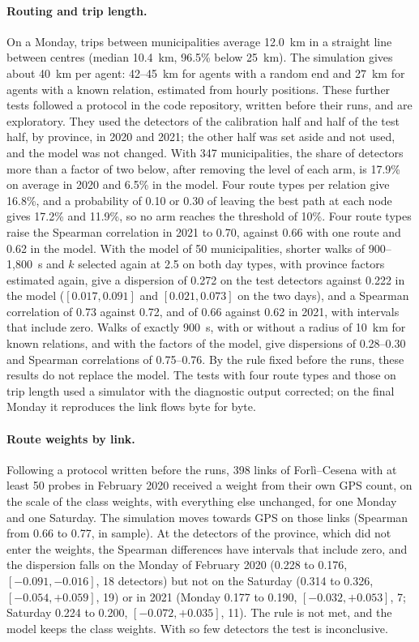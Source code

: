 \documentclass[11pt,a4paper]{article}
\begin{document}
\paragraph{Routing and trip length.} On a Monday, trips between municipalities average 12.0~km in a straight line between centres (median 10.4~km, 96.5\% below 25~km). The simulation gives about 40~km per agent: 42--45~km for agents with a random end and 27~km for agents with a known relation, estimated from hourly positions. These further tests followed a protocol in the code repository, written before their runs, and are exploratory. They used the detectors of the calibration half and half of the test half, by province, in 2020 and 2021; the other half was set aside and not used, and the model was not changed. With 347 municipalities, the share of detectors more than a factor of two below, after removing the level of each arm, is 17.9\% on average in 2020 and 6.5\% in the model. Four route types per relation give 16.8\%, and a probability of 0.10 or 0.30 of leaving the best path at each node gives 17.2\% and 11.9\%, so no arm reaches the threshold of 10\%. Four route types raise the Spearman correlation in 2021 to 0.70, against 0.66 with one route and 0.62 in the model. With the model of 50 municipalities, shorter walks of 900--1,800~s and $k$ selected again at 2.5 on both day types, with province factors estimated again, give a dispersion of 0.272 on the test detectors against 0.222 in the model ($[0.017, 0.091]$ and $[0.021, 0.073]$ on the two days), and a Spearman correlation of 0.73 against 0.72, and of 0.66 against 0.62 in 2021, with intervals that include zero. Walks of exactly 900~s, with or without a radius of 10~km for known relations, and with the factors of the model, give dispersions of 0.28--0.30 and Spearman correlations of 0.75--0.76. By the rule fixed before the runs, these results do not replace the model. The tests with four route types and those on trip length used a simulator with the diagnostic output corrected; on the final Monday it reproduces the link flows byte for byte.

\paragraph{Route weights by link.} Following a protocol written before the runs, 398 links of Forl\`i--Cesena with at least 50 probes in February 2020 received a weight from their own GPS count, on the scale of the class weights, with everything else unchanged, for one Monday and one Saturday. The simulation moves towards GPS on those links (Spearman from 0.66 to 0.77, in sample). At the detectors of the province, which did not enter the weights, the Spearman differences have intervals that include zero, and the dispersion falls on the Monday of February 2020 (0.228 to 0.176, $[-0.091, -0.016]$, 18 detectors) but not on the Saturday (0.314 to 0.326, $[-0.054, +0.059]$, 19) or in 2021 (Monday 0.177 to 0.190, $[-0.032, +0.053]$, 7; Saturday 0.224 to 0.200, $[-0.072, +0.035]$, 11). The rule is not met, and the model keeps the class weights. With so few detectors the test is inconclusive.
\end{document}
